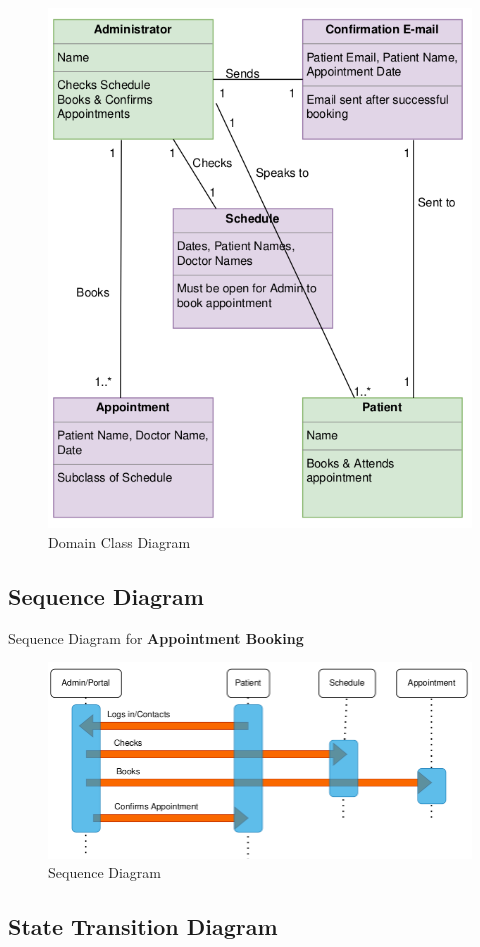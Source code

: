 \documentclass{article}
\begin{document}
\begin{enumerate}
\begin{figure}[H]
  \centering
  \includegraphics[width=0.8\linewidth]{../images/domain_class_diagram.png}
  \caption{Domain Class Diagram}
\end{figure}

\newpage
\subsection{Sequence Diagram}

Sequence Diagram for \textbf{Appointment Booking}

\begin{figure}[H]
  \centering
  \includegraphics[width=0.8\linewidth]{../images/sequence_diagram.png}
  \caption{Sequence Diagram}
\end{figure}

\subsection{State Transition Diagram}


\end{enumerate}
\end{document}
